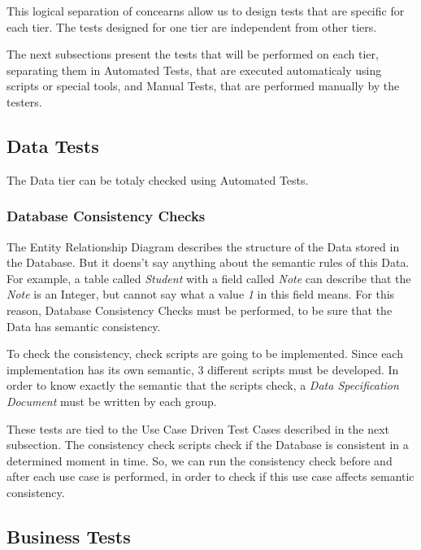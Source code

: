 \documentclass[11pt]{article}
\begin{document}
This logical separation of concearns allow us to design tests that are specific for each tier. The tests designed for one tier are independent from other tiers.

The next subsections present the tests that will be performed on each tier, separating them in Automated Tests, that are executed automaticaly using scripts or special tools, and Manual Tests, that are performed manually by the testers.

\subsection{Data Tests}

\indent

The Data tier can be totaly checked using Automated Tests.

\subsubsection*{Database Consistency Checks}

\indent

The Entity Relationship Diagram describes the structure of the Data stored in the Database. But it doens't say anything about the semantic rules of this Data. For example, a table called {\it Student} with a field called {\it Note} can describe that the {\it Note} is an Integer, but cannot say what a value {\it 1} in this field means. For this reason, Database Consistency Checks must be performed, to be sure that the Data has semantic consistency.

To check the consistency, check scripts are going to be implemented. Since each implementation has its own semantic, 3 different scripts must be developed. In order to know exactly the semantic that the scripts check, a {\it Data Specification Document} must be written by each group.

These tests are tied to the Use Case Driven Test Cases described in the next subsection. The consistency check scripts check if the Database is consistent in a determined moment in time. So, we can run the consistency check before and after each use case is performed, in order to check if this use case affects semantic consistency.

\subsection{Business Tests}
\end{document}
